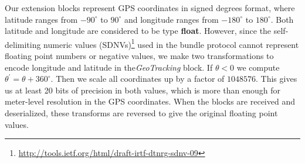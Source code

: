 Our extension blocks represent GPS coordinates in signed degrees format, where latitude ranges from $-90^{\circ}$ to $90^{\circ}$ and longitude ranges from $-180^{\circ}$ to $180^{\circ}$.  Both latitude and longitude are considered to be type {\bf float}.  However, since the self-delimiting numeric values (SDNVs)\footnote{\scriptsize\url{http://tools.ietf.org/html/draft-irtf-dtnrg-sdnv-09}} used in the bundle protocol cannot represent floating point numbers or negative values, we make two transformations to encode longitude and latitude in the{\em GeoTracking} block.  If $\theta<0$ we compute $\theta^{\prime}=\theta+360^{\circ}$.  Then we scale all coordinates up by a factor of $1048576$.  This gives us at least 20 bits of precision in both values, which is more than enough for meter-level resolution in the GPS coordinates.  When the blocks are received and deserialized, these transforms are reversed to give the original floating point values.



